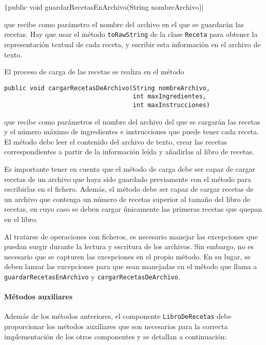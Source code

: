 \documentclass[
    a4paper, %
    12pt, %
]{CSSullivanBusinessReport}
\begin{document}
\texttt|public void guardarRecetasEnArchivo(String nombreArchivo)|

que recibe como parámetro el nombre del archivo en el que se guardarán las recetas. Hay que usar el método \texttt{toRawString} de la clase \texttt{Receta} para obtener la representación textual de cada receta, y escribir esta información en el archivo de texto.

El proceso de carga de las recetas se realiza en el método

\begin{verbatim}
public void cargarRecetasDeArchivo(String nombreArchivo, 
                                   int maxIngredientes,
                                   int maxInstrucciones)
\end{verbatim}

que recibe como parámetros el nombre del archivo del que se cargarán las recetas y el número máximo de ingredientes e instrucciones que puede tener cada receta. El método debe leer el contenido del archivo de texto, crear las recetas correspondientes a partir de la información leída y añadirlas al libro de recetas.

Es importante tener en cuenta que el método de carga debe ser capaz de cargar recetas de un archivo que haya sido guardado previamente con el método para escribirlas en el fichero. Además, el método debe ser capaz de cargar recetas de un archivo que contenga un número de recetas superior al tamaño del libro de recetas, en cuyo caso se deben cargar únicamente las primeras recetas que quepan en el libro.

Al tratarse de operaciones con ficheros, es necesario manejar las excepciones que puedan surgir durante la lectura y escritura de los archivos. Sin embargo, no es necesario que se capturen las excepciones en el propio método. En su lugar, se deben lanzar las excepciones para que sean manejadas en el método que llama a \texttt{guardarRecetasEnArchivo} y \texttt{cargarRecetasDeArchivo}.

\paragraph{Métodos auxiliares}

Además de los métodos anteriores, el componente \texttt{LibroDeRecetas} debe proporcionar los métodos auxiliares que son necesarios para la correcta implementación de los otros componentes y se detallan a continuación:
\end{document}
